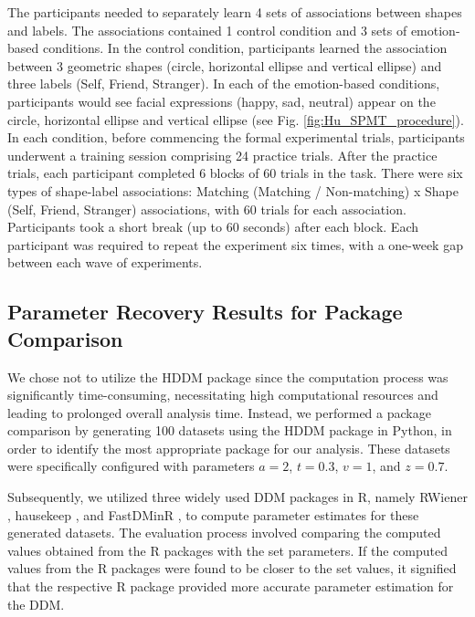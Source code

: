 \documentclass[sn-apa]{sn-jnl}%
\theoremstyle{thmstyleone}%
\theoremstyle{thmstyletwo}%
\theoremstyle{thmstylethree}%
\begin{document}
The participants needed to separately learn 4 sets of associations between shapes and labels. The associations contained 1 control condition and 3 sets of emotion-based conditions. In the control condition, participants learned the association between 3 geometric shapes (circle, horizontal ellipse and vertical ellipse) and three labels (Self, Friend, Stranger). In each of the emotion-based conditions, participants would see facial expressions (happy, sad, neutral) appear on the circle, horizontal ellipse and vertical ellipse (see Fig. \ref{fig:Hu_SPMT_procedure}). In each condition, before commencing the formal experimental trials, participants underwent a training session comprising 24 practice trials. After the practice trials, each participant completed 6 blocks of 60 trials in the task. There were six types of shape-label associations: Matching (Matching / Non-matching) x Shape (Self, Friend, Stranger) associations, with 60 trials for each association. Participants took a short break (up to 60 seconds) after each block. Each participant was required to repeat the experiment six times, with a one-week gap between each wave of experiments.

\subsection{Parameter Recovery Results for Package Comparison }\label{sec:ParameterRecovery}

We chose not to utilize the HDDM package \parencite{wiecki2013hddm} since the computation process was significantly time-consuming, necessitating high computational resources and leading to prolonged overall analysis time. Instead, we performed a package comparison by generating 100 datasets using the HDDM package in Python, in order to identify the most appropriate package for our analysis. These datasets were specifically configured with parameters $a = 2$, $t = 0.3$, $v = 1$, and $z = 0.7$. 

Subsequently, we utilized three widely used DDM packages in R, namely RWiener \parencite{viechtbauer2010conducting}, hausekeep \parencite{Lin2019how}, and FastDMinR \parencite{voss2007fast}, to compute parameter estimates for these generated datasets. The evaluation process involved comparing the computed values obtained from the R packages with the set parameters. If the computed values from the R packages were found to be closer to the set values, it signified that the respective R package provided more accurate parameter estimation for the DDM.
\end{document}
